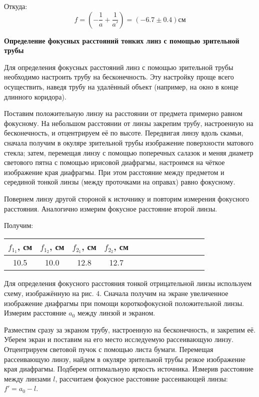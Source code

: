 \documentclass[14pt]{article}
\begin{document}
Откуда:
$$
	f = \left(-\frac{1}{a} + \frac{1}{a'}\right) = (-6.7 \pm 0.4)\text{см}
$$


\vspace{1cm}
\textbf{Определение фокусных расстояний тонких линз с помощью
зрительной трубы}

Для определения фокусных расстояний линз с помощью зрительной трубы
необходимо настроить трубу на бесконечность. Эту настройку проще
всего осуществить, наведя трубу на
удалённый объект (например, на
окно в конце длинного
коридора).

Поставим положительную линзу на расстоянии от предмета примерно
равном фокусному. На небольшом расстоянии от линзы закрепим трубу,
настроенную на бесконечность,
и отцентрируем её по высоте. Передвигая
линзу вдоль скамьи, сначала получим в окуляре зрительной трубы
изображение поверхности матового стекла; затем, перемещая линзу с
помощью поперечных салазок
и меняя диаметр светового пятна с помощью
ирисовой диафрагмы, настроимся на чёткое изображение края
диафрагмы. При этом расстояние между предметом
и серединой тонкой
линзы (между проточками на оправах) равно фокусному.

Повернем линзу другой стороной к источнику и повторим измерения фокусного расстояния. Аналогично измерим фокусное расстояние второй линзы.

Получим:
\begin{center}
\begin{tabular}{|c|c|c|c|c|c|c|c|c|c|c|c|c|}
\hline
$f_{1_1}$, см	&	$f_{1_2}$, см	&	$f_{2_1}$, см	&	$f_{2_2}$, см	\\
\hline
10.5			&	10.0			&	12.8			&	12.7			\\
\hline
\end{tabular}
\end{center}

Для определения фокусного расстояния тонкой отрицательной линзы используем
схему, изображённую на рис. 4. Сначала получим на экране
увеличенное изображение диафрагмы при помощи
короткофокусной положительной
линзы. Измерим расстояние
$a_0$ между линзой и экраном.

Разместим сразу за экраном трубу, настроенную на бесконечность,
и закрепим её. Уберем экран и поставим на его место исследуемую
рассеивающую линзу. Отцентрируем световой пучок с помощью листа
бумаги. Перемещая рассеивающую линзу, найдем в окуляре зрительной
трубы резкое изображение края диафрагмы.
Подберем оптимальную яркость источника.
Измерив расстояние между линзами $l$, рассчитаем фокусное расстояние
рассеивающей линзы:
$f' = a_0 − l$.
\end{document}

